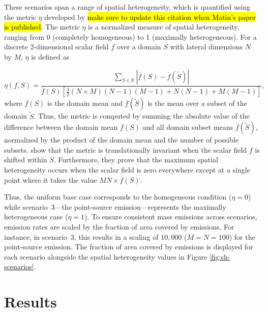 \documentclass[journal abbreviation, manuscript]{copernicus}
\begin{document}
These scenarios span a range of spatial heterogeneity, which is
quantified using the metric $\eta$ developed by
\citep{mohebalhojeh_2024} \hl{make sure to update this citation when
  Matin's paper is published}. The metric $\eta$ is a normalized
measure of spatial heterogeneity, ranging from 0 (completely
homogeneous) to 1 (maximally heterogeneous). For a discrete
2-dimensional scalar field $f$ over a domain $S$ with lateral
dimensions $N$ by $M$, $\eta$ is defined as

\begin{equation}
\eta(f, S) = \frac{\sum_{\tilde{S}\in \mathbb{R}}|\overline{f}(S) - \overline{f}(\tilde{S})|}{\overline{f}(S)\left[\frac{3}{2}(N\times M)(N-1)(M-1) + N(N-1) + M(M-1)\right]}, 
\end{equation}
where $\overline{f}(S)$ is the domain mean and
$\overline{f}(\tilde{S})$ is the mean over a subset of the domain
$\tilde{S}$. Thus, the metric is computed by summing the absolute
value of the difference between the domain mean $\overline{f}(S)$ and
all domain subset means $\overline{f}(\tilde{S})$, normalized by the
product of the domain mean and the number of possible
subsets. \citet{mohebalhojeh_2024} show that the metric is
translationally invariant when the scalar field $f$ is shifted within
$S$. Furthermore, they prove that the
maximum spatial heterogeneity occurs when the
scalar field is zero everywhere except at a single point
where it takes the value $MN\times\overline{f}(S)$.

Thus, the uniform base case corresponds to the homogeneous condition
($\eta = 0$) while scenario~3---the point-source
emission---represents the maximally heterogeneous case ($\eta =
1$). To ensure consistent mass emissions across scenarios, emission
rates are scaled by the fraction of area covered by emissions. For
instance, in scenario~3, this results in a scaling of $10,000$
($M=N=100$) for the point-source emission. The fraction of area
covered by emissions is displayed for each scenario alongside the
spatial heterogeneity values in Figure \ref{fig:sh-scenarios}.

\section{Results}
\end{document}

